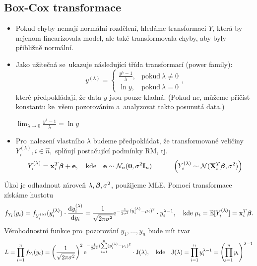 \subsection{Box-Cox transformace}
\begin{itemize}
\item Pokud chyby nemají normální rozdělení, hledáme transformaci $Y$, která by nejenom linearizovala model, ale také transformovala chyby, aby byly přibližně normální.
\item Jako užitečná se~ukazuje následující třída transformací (power family):
 $$
 y^{(\lambda)} = \begin{cases}
      \frac{y^{\lambda}-1}{\lambda}, & \text{pokud}\ \lambda \neq 0 \\
      \ln y, & \text{pokud}\ \lambda = 0
    \end{cases},
 $$
které předpokládají, že data $y$ jsou pouze kladná. (Pokud ne, můžeme přičíst konstantu ke~všem pozorováním a~analyzovat takto posunutá data.)
\begin{remark}
 $\lim_{\lambda \rightarrow 0}  \frac{y^{\lambda}-1}{\lambda} = \ln y$
\end{remark}
\item Pro~nalezení vlastního $\lambda$ budeme předpokládat, že transformované veličiny \\ $Y_i^{(\lambda)}, i\in\widehat{n},$ splňují postačující podmínky RM, tj.
 $$
 Y_i^{(\lambda)} = \mathbf{x}_i^T \boldsymbol{\beta} + \mathbf{e}, \quad \text{kde} \quad \mathbf{e} \sim \mathcal{N}_n (\boldsymbol{0},\sigma^2 \textbf{I}_{n}) \quad \quad \quad \left(Y_i^{(\lambda)} \sim \mathcal{N} (\mathbf{X}_i^T \boldsymbol{\beta}, \sigma^2) \right)
 $$
\end{itemize}
Úkol je odhadnout zároveň $\lambda, \boldsymbol{\beta}, \sigma^2$, použijeme MLE. Pomocí transformace získáme hustotu
 $$
  f_{Y_i}(y_i) = f_{Y_i^{(\lambda)}}(y_i^{(\lambda)}) \cdot \frac{\mathrm{d} y_i^{(\lambda)}}{\mathrm{d} y_i} = \frac{1}{\sqrt{2 \pi \sigma^2}} \mathrm{e}^{-\frac{1}{2 \sigma^2}(y_i^{(\lambda)} - \mu_i)^2} \cdot y_i^{\lambda - 1}, \quad \text{kde} \; \mu_i = \mathbb{E}[Y_i^{(\lambda)}] = \mathbf{x}_i^T \boldsymbol{\beta}.
 $$
Věrohodnostní funkce pro~pozorování $y_1,\dots,y_n$ bude mít tvar
 $$
  L = \prod_{i = 1}^nf_{Y_i}(y_i) = \left(\frac{1}{\sqrt{2 \pi \sigma^2}} \right)^2 \mathrm{e}^{-\frac{1}{2 \sigma^2}(\sum\limits_{i=1}^{n} (y_i^{(\lambda)} - \mu_i)^2} \cdot \mathrm{J}(\lambda), \quad \text{kde} \quad \mathrm{J}(\lambda) = \prod_{i = 1}^n y_i^{\lambda - 1} = \left(\prod_{i = 1}^n y_i \right)^{\lambda - 1}
 $$

